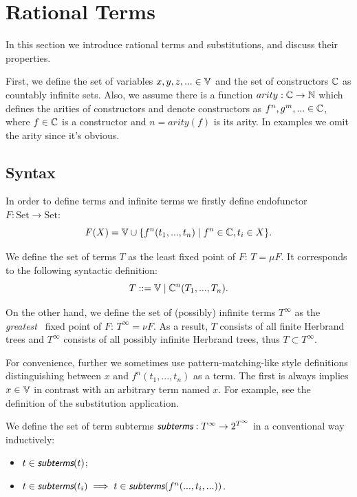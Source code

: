 \section{Rational Terms}

In this section we introduce rational terms and substitutions, and discuss their properties.

First, we define the set of variables $x, y, z, ... \in \mathbb{V}$ and the set of constructors $\mathbb{C}$ as countably infinite sets. Also, we assume there is a function $arity : \mathbb{C} \rightarrow \mathbb{N}$ which defines the arities of constructors and denote constructors as $f^n, g^m, ... \in \mathbb{C}$, where $f \in \mathbb{C}$ is a constructor and $n = arity(f)$ is its arity. In examples we omit the arity since it's obvious.


\subsection{Syntax}

In order to define terms and infinite terms we firstly define endofunctor $F : \text{Set} \rightarrow \text{Set}$:
\[F(X) = \mathbb{V} \cup \{ f^n(t_1, ..., t_n) \mid f^n \in \mathbb{C}, t_i \in X \}.\]

We define the set of terms $T$ as the least fixed point of $F$: $T = \mu F$. It corresponds to the following syntactic definition:
\[T ::= \mathbb{V} \mid \mathbb{C}^n(T_1, ..., T_n).\]

On the other hand, we define the set of (possibly) infinite terms $T^\infty$ as the \textit{greatest}~\cite{simon2006coinductive} fixed point of $F$: $T^\infty = \nu F$. As a result, $T$ consists of all finite Herbrand trees and $T^\infty$ consists of all possibly infinite Herbrand trees, thus $T \subset T^\infty$. 

For convenience, further we sometimes use pattern-matching-like style definitions distinguishing between $x$ and $f^n(t_1, ..., t_n)$ as a term. The first is always implies $x \in \mathbb{V}$ in contrast with an arbitrary term named $x$. For example, see the definition of the substitution application.

We define the set of term subterms $\subterms : T^\infty \rightarrow 2^{T^\infty}$ in a conventional way inductively:
\begin{itemize}
    \item $t \in \subterms(t)$;
    \item $t \in \subterms(t_i) \implies t \in \subterms(f^n(..., t_i, ...))$.
\end{itemize}

